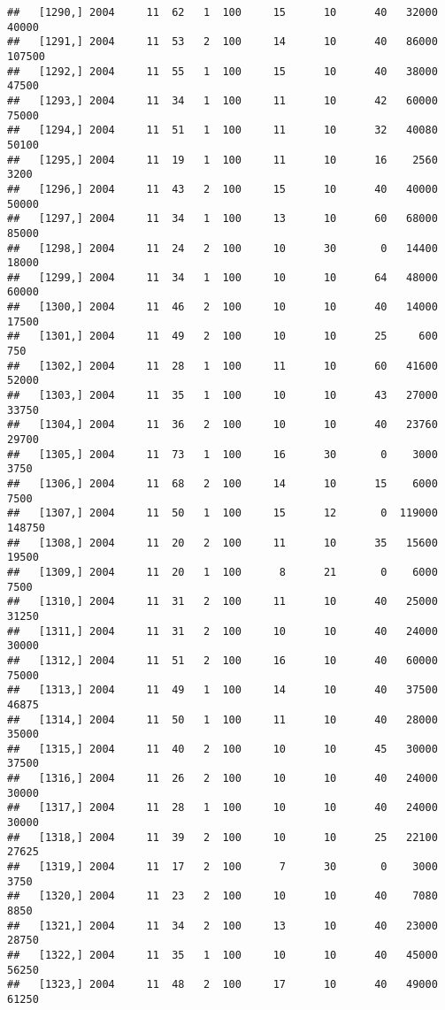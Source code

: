 \documentclass{article}\usepackage[]{graphicx}\usepackage[]{color}
\makeatletter
\newenvironment{kframe}{%
 \def\at@end@of@kframe{}%
 \ifinner\ifhmode%
  \def\at@end@of@kframe{\end{minipage}}%
  \begin{minipage}{\columnwidth}%
 \fi\fi%
 \def\FrameCommand##1{\hskip\@totalleftmargin \hskip-\fboxsep
 \colorbox{shadecolor}{##1}\hskip-\fboxsep
     \hskip-\linewidth \hskip-\@totalleftmargin \hskip\columnwidth}%
 \MakeFramed {\advance\hsize-\width
   \@totalleftmargin\z@ \linewidth\hsize
   \@setminipage}}%
 {\par\unskip\endMakeFramed%
 \at@end@of@kframe}
\newenvironment{knitrout}{}{} %
\makeatother
\begin{document}
\begin{knitrout}
\begin{kframe}
\begin{verbatim}
##   [1290,] 2004     11  62   1  100     15      10      40   32000   40000
##   [1291,] 2004     11  53   2  100     14      10      40   86000  107500
##   [1292,] 2004     11  55   1  100     15      10      40   38000   47500
##   [1293,] 2004     11  34   1  100     11      10      42   60000   75000
##   [1294,] 2004     11  51   1  100     11      10      32   40080   50100
##   [1295,] 2004     11  19   1  100     11      10      16    2560    3200
##   [1296,] 2004     11  43   2  100     15      10      40   40000   50000
##   [1297,] 2004     11  34   1  100     13      10      60   68000   85000
##   [1298,] 2004     11  24   2  100     10      30       0   14400   18000
##   [1299,] 2004     11  34   1  100     10      10      64   48000   60000
##   [1300,] 2004     11  46   2  100     10      10      40   14000   17500
##   [1301,] 2004     11  49   2  100     10      10      25     600     750
##   [1302,] 2004     11  28   1  100     11      10      60   41600   52000
##   [1303,] 2004     11  35   1  100     10      10      43   27000   33750
##   [1304,] 2004     11  36   2  100     10      10      40   23760   29700
##   [1305,] 2004     11  73   1  100     16      30       0    3000    3750
##   [1306,] 2004     11  68   2  100     14      10      15    6000    7500
##   [1307,] 2004     11  50   1  100     15      12       0  119000  148750
##   [1308,] 2004     11  20   2  100     11      10      35   15600   19500
##   [1309,] 2004     11  20   1  100      8      21       0    6000    7500
##   [1310,] 2004     11  31   2  100     11      10      40   25000   31250
##   [1311,] 2004     11  31   2  100     10      10      40   24000   30000
##   [1312,] 2004     11  51   2  100     16      10      40   60000   75000
##   [1313,] 2004     11  49   1  100     14      10      40   37500   46875
##   [1314,] 2004     11  50   1  100     11      10      40   28000   35000
##   [1315,] 2004     11  40   2  100     10      10      45   30000   37500
##   [1316,] 2004     11  26   2  100     10      10      40   24000   30000
##   [1317,] 2004     11  28   1  100     10      10      40   24000   30000
##   [1318,] 2004     11  39   2  100     10      10      25   22100   27625
##   [1319,] 2004     11  17   2  100      7      30       0    3000    3750
##   [1320,] 2004     11  23   2  100     10      10      40    7080    8850
##   [1321,] 2004     11  34   2  100     13      10      40   23000   28750
##   [1322,] 2004     11  35   1  100     10      10      40   45000   56250
##   [1323,] 2004     11  48   2  100     17      10      40   49000   61250

\end{verbatim}
\end{kframe}
\end{knitrout}
\end{document}
